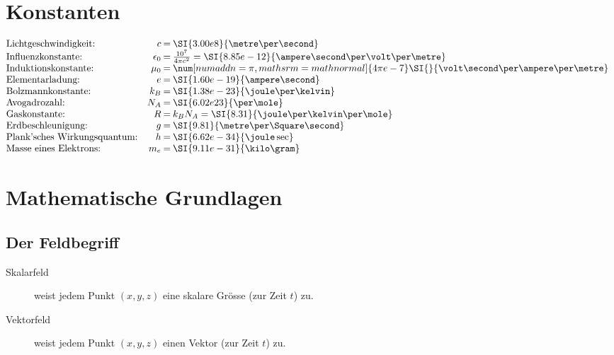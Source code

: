 
\section{Konstanten} %
	{
		\setlength{\mathindent}{0pt}
		\begin{equation*}
			\begin{array}{@{}l@{\quad}r@{\:=\:}l}
				\text{Lichtgeschwindigkeit:} & c & \SI{3.00e8}{\metre\per\second} \\
				\text{Influenzkonstante:} & \epsilon_0 & \frac{10^7}{4\pi c^2} = \SI{8.85e-12}{\ampere\second\per\volt\per\metre} \\
				\text{Induktionskonstante:} & \mu_0 & \num[numaddn=\pi,mathsrm=mathnormal]{4\pi e-7}\SI{}{\volt\second\per\ampere\per\metre} \\
				\text{Elementarladung:} & e & \SI{1.60e-19}{\ampere\second} \\
				\text{Bolzmannkonstante:} & k_B & \SI{1.38e-23}{\joule\per\kelvin} \\
				\text{Avogadrozahl:} & N_A & \SI{6.02e23}{\per\mole} \\
				\text{Gaskonstante:} & R & k_B N_A = \SI{8.31}{\joule\per\kelvin\per\mole} \\
				\text{Erdbeschleunigung:} & g & \SI{9.81}{\metre\per\Square\second} \\
				\text{Plank'sches Wirkungsquantum:} & h & \SI{6.62e-34}{\joule\sec} \\
				\text{Masse eines Elektrons:} & m_e & \SI{9.11e-31}{\kilo\gram}
			\end{array}
		\end{equation*}
	}

\section{Mathematische Grundlagen} %
	
	\subsection{Der Feldbegriff} %
		
		\begin{description}
			
			\item[Skalarfeld]
			weist jedem Punkt $(x,y,z)$ eine skalare Grösse (zur Zeit $t$) zu.
			
			\item[Vektorfeld]
			weist jedem Punkt $(x,y,z)$ einen Vektor (zur Zeit $t$) zu.
			
		\end{description}
		
